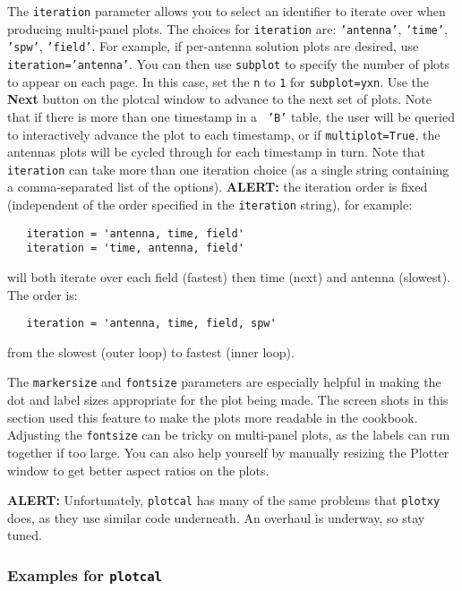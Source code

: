 {The {\tt iteration} parameter allows you to select an identifier to
iterate over when producing multi-panel plots.  The choices
for {\tt iteration} are: {\tt 'antenna'}, {\tt 'time'}, 
{\tt 'spw'}, {\tt 'field'}.  For example, if per-antenna solution 
plots are desired, use {\tt iteration='antenna'}.  You can then use
{\tt  subplot} to specify the number of plots to appear on each page.
In this case, set the {\tt n} to {\tt 1} for {\tt subplot=yxn}.  
Use the {\bf Next} button on the plotcal window to advance to the next
set of plots.  Note that if there is more than one timestamp in a {\tt
'B'} table, the user will be queried to interactively advance the plot
to each timestamp, or if {\tt multiplot=True}, the antennas plots will
be cycled through for each timestamp in turn.  Note that 
{\tt iteration} can take more than one iteration choice (as a single
string containing a comma-separated list of the options).
{\bf ALERT:} the iteration order is fixed (independent of the
order specified in the {\tt iteration} string), for example:
\small
\begin{verbatim}
   iteration = 'antenna, time, field'
   iteration = 'time, antenna, field'
\end{verbatim}
\normalsize
will both iterate over each field (fastest) then time (next) and antenna
(slowest).  The order is:
\small
\begin{verbatim}
   iteration = 'antenna, time, field, spw'
\end{verbatim}
\normalsize
from the slowest (outer loop) to fastest (inner loop).

The {\tt markersize} and {\tt fontsize} parameters are especially
helpful in making the dot and label sizes appropriate for the
plot being made.  The screen shots in this section used this feature
to make the plots more readable in the cookbook.  Adjusting the
{\tt fontsize} can be tricky on multi-panel plots, as the labels
can run together if too large.  You can also help yourself by manually
resizing the Plotter window to get better aspect ratios on the plots.

{\bf ALERT:} Unfortunately, {\tt plotcal} has many of the same
problems that {\tt plotxy} does, as they use similar code underneath.
An overhaul is underway, so stay tuned.

\subsubsection{Examples for {\tt plotcal}}
\label{section:cal.tables.plotcal.examples}

}
